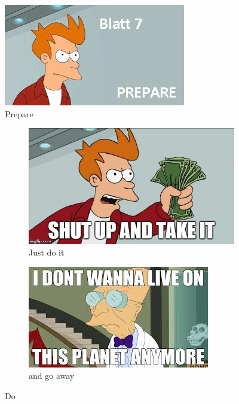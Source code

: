 \documentclass{article}
\begin{document}
\begin{figure}
	\centering
	\includegraphics[width=\textwidth, angle=0]{Prepare}
	\caption{Prepare}
\end{figure}

\blindtext

\begin{figure}[b]
	\centering
	\begin{subfigure}{.5\textwidth}
		\includegraphics[width=\textwidth]{take-it}
		\caption{Just do it}
	\end{subfigure}%
	\begin{subfigure}{.5\textwidth}
		\includegraphics[width=.9\textwidth]{go-away}
		\caption{and go away}
	\end{subfigure}

	\caption{Do}
	

\end{figure}
\end{document}
